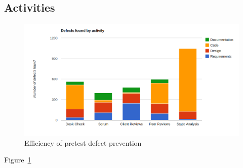 
\subsection{Activities}

\begin{figure}[t]
\begin{center}
\includegraphics[width=1.0\textwidth]{image/pretest-efficiency.png}
\end{center}
\caption{Efficiency of pretest defect prevention}
\label{fig:pretest-efficiency}
\end{figure}

Figure~\ref{fig:pretest-efficiency}


 
 

